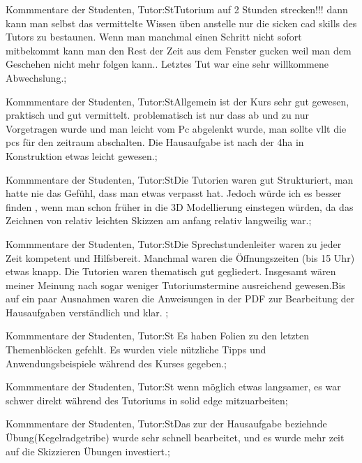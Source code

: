 \documentclass[10pt]{beamer}
\begin{document}
\begin{frame}[fragile]{Kommmentare der Studenten, Tutor:St}Tutorium auf 2 Stunden strecken!!! dann kann man selbst das vermittelte Wissen üben anstelle nur die sicken cad skills des Tutors zu bestaunen. Wenn man manchmal einen Schritt nicht sofort mitbekommt kann man den Rest der Zeit aus dem Fenster gucken weil man dem Geschehen nicht mehr folgen kann..  Letztes Tut war eine sehr willkommene Abwechslung.;
 \end{frame}
\begin{frame}[fragile]{Kommmentare der Studenten, Tutor:St}Allgemein ist der Kurs sehr gut gewesen, praktisch und gut vermittelt.
 problematisch ist nur dass ab und zu nur Vorgetragen wurde und man leicht vom Pc abgelenkt wurde, man sollte vllt die pcs für den zeitraum abschalten.
 Die Hausaufgabe ist nach der 4ha in Konstruktion etwas leicht gewesen.;
 \end{frame}
\begin{frame}[fragile]{Kommmentare der Studenten, Tutor:St}Die Tutorien waren gut Strukturiert, man hatte nie das Gefühl, dass man etwas verpasst hat. Jedoch würde ich es besser finden , wenn man schon früher in die 3D Modellierung einstegen würden, da das Zeichnen von relativ leichten Skizzen am anfang relativ langweilig war.;
 \end{frame}
\begin{frame}[fragile]{Kommmentare der Studenten, Tutor:St}Die Sprechstundenleiter waren zu jeder Zeit kompetent und Hilfsbereit. Manchmal waren die Öffnungszeiten (bis 15 Uhr) etwas knapp. Die Tutorien waren thematisch gut gegliedert. Insgesamt wären meiner Meinung nach sogar weniger Tutoriumstermine ausreichend gewesen.Bis auf ein paar Ausnahmen waren die Anweisungen in der PDF zur Bearbeitung der Hausaufgaben verständlich und klar.  ;
 \end{frame}
\begin{frame}[fragile]{Kommmentare der Studenten, Tutor:St}  Es haben Folien zu den letzten Themenblöcken gefehlt.   Es wurden viele nützliche Tipps und Anwendungsbeispiele während des Kurses gegeben.;
 \end{frame}
\begin{frame}[fragile]{Kommmentare der Studenten, Tutor:St} wenn möglich etwas langsamer, es war schwer direkt während des Tutoriums in solid edge mitzuarbeiten;
 \end{frame}
\begin{frame}[fragile]{Kommmentare der Studenten, Tutor:St}Das zur der Hausaufgabe beziehnde Übung(Kegelradgetribe) wurde sehr schnell bearbeitet, und es wurde mehr zeit auf die Skizzieren Übungen investiert.;
 \end{frame}
\end{document}
